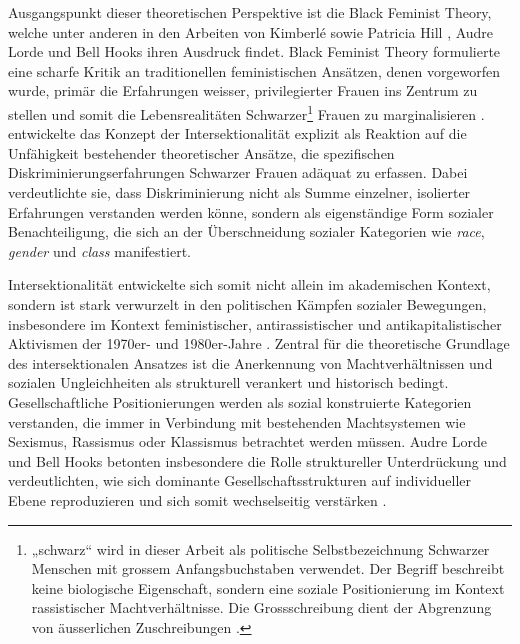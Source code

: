 Ausgangspunkt dieser theoretischen Perspektive ist die Black Feminist Theory, welche unter anderen in den Arbeiten von Kimberlé \textcite{crenshawMappingMarginsIntersectionality1991} sowie Patricia Hill \textcite{collinsBlackFeministThought2002}, Audre Lorde und Bell Hooks ihren Ausdruck findet. Black Feminist Theory formulierte eine scharfe Kritik an traditionellen feministischen Ansätzen, denen vorgeworfen wurde, primär die Erfahrungen weisser, privilegierter Frauen ins Zentrum zu stellen und somit die Lebensrealitäten Schwarzer\footnote{„\gls{schwarz}“ wird in dieser Arbeit als politische Selbstbezeichnung Schwarzer Menschen mit grossem Anfangsbuchstaben verwendet. Der Begriff beschreibt keine biologische Eigenschaft, sondern eine soziale Positionierung im Kontext rassistischer Machtverhältnisse. Die Grossschreibung dient der Abgrenzung von äusserlichen Zuschreibungen \parencite{oguntoyeFarbeBekennenAfrodeutsche1986}.} Frauen zu marginalisieren \parencite{collinsBlackFeministThought2002}. \textcite{crenshawMappingMarginsIntersectionality1991} entwickelte das Konzept der Intersektionalität explizit als Reaktion auf die Unfähigkeit bestehender theoretischer Ansätze, die spezifischen Diskriminierungserfahrungen Schwarzer Frauen adäquat zu erfassen. Dabei verdeutlichte sie, dass Diskriminierung nicht als Summe einzelner, isolierter Erfahrungen verstanden werden könne, sondern als eigenständige Form sozialer Benachteiligung, die sich an der Überschneidung sozialer Kategorien wie \textit{race}, \textit{gender} und \textit{class} manifestiert.

Intersektionalität entwickelte sich somit nicht allein im akademischen Kontext, sondern ist stark verwurzelt in den politischen Kämpfen sozialer Bewegungen, insbesondere im Kontext feministischer, antirassistischer und antikapitalistischer Aktivismen der 1970er- und 1980er-Jahre \parencite{collinsBlackFeministThought2002}. Zentral für die theoretische Grundlage des intersektionalen Ansatzes ist die Anerkennung von Machtverhältnissen und sozialen Ungleichheiten als strukturell verankert und historisch bedingt. Gesellschaftliche Positionierungen werden als sozial konstruierte Kategorien verstanden, die immer in Verbindung mit bestehenden Machtsystemen wie Sexismus, Rassismus oder Klassismus betrachtet werden müssen. Audre Lorde und Bell Hooks betonten insbesondere die Rolle struktureller Unterdrückung und verdeutlichten, wie sich dominante Gesellschaftsstrukturen auf individueller Ebene reproduzieren und sich somit wechselseitig verstärken \parencite{collinsBlackFeministThought2002, hancockWhenMultiplicationDoesnt2007}.

